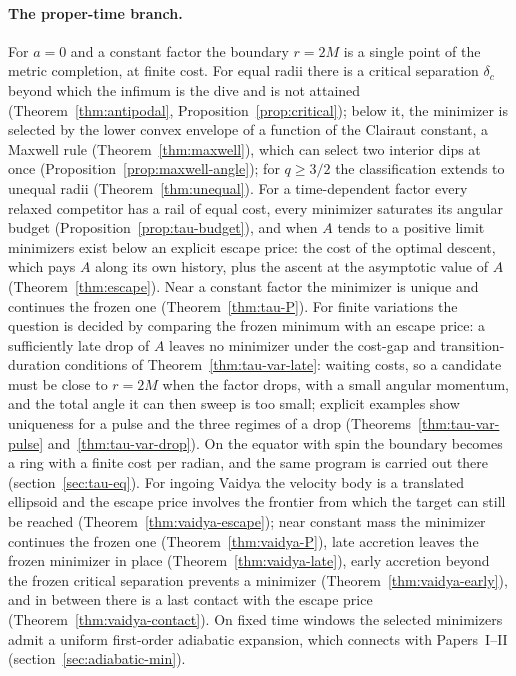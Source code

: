 \documentclass[aip,jmp,amsmath,amssymb,reprint]{revtex4-2}
\theoremstyle{plain}
\theoremstyle{definition}
\begin{document}
\paragraph{The proper-time branch.} For $a=0$ and a constant factor the boundary $r=2M$ is a single
point of the metric completion, at finite cost. For equal radii there is a critical separation
$\delta_c$ beyond which the infimum is the dive and is not attained (Theorem~\ref{thm:antipodal},
Proposition~\ref{prop:critical}); below it, the minimizer is selected by the lower convex envelope of
a function of the Clairaut constant, a Maxwell rule (Theorem~\ref{thm:maxwell}), which can select two
interior dips at once (Proposition~\ref{prop:maxwell-angle}); for $q\ge3/2$ the classification extends
to unequal radii (Theorem~\ref{thm:unequal}). For a time-dependent factor every relaxed competitor
has a rail of equal cost, every minimizer saturates its angular budget
(Proposition~\ref{prop:tau-budget}), and when $A$ tends to a positive limit minimizers exist below an
explicit escape price: the cost of
the optimal descent, which pays $A$ along its own history, plus the ascent at the asymptotic value of
$A$ (Theorem~\ref{thm:escape}). Near a constant factor the minimizer is unique and continues the frozen
one (Theorem~\ref{thm:tau-P}). For finite variations the question is decided by comparing the frozen
minimum with an escape price: a sufficiently late drop of $A$ leaves no minimizer under the
cost-gap and transition-duration conditions of Theorem~\ref{thm:tau-var-late}: waiting costs, so a candidate must be close to $r=2M$ when
the factor drops, with a small angular momentum, and the total angle it can then sweep is too small; explicit examples show uniqueness for a pulse and the three
regimes of a drop (Theorems~\ref{thm:tau-var-pulse} and~\ref{thm:tau-var-drop}). On the equator with
spin the boundary becomes a ring with a finite cost per radian, and the same program is carried out
there (section~\ref{sec:tau-eq}). For ingoing Vaidya the velocity body is a translated ellipsoid and
the escape price involves the frontier from which the target can still be reached
(Theorem~\ref{thm:vaidya-escape}); near constant mass the minimizer continues the frozen one
(Theorem~\ref{thm:vaidya-P}), late accretion leaves the frozen minimizer in place
(Theorem~\ref{thm:vaidya-late}), early accretion beyond the frozen critical separation prevents a
minimizer (Theorem~\ref{thm:vaidya-early}), and in between there is a last contact with the escape
price (Theorem~\ref{thm:vaidya-contact}). On fixed time windows the selected minimizers admit a uniform
first-order adiabatic expansion, which connects with Papers~I--II (section~\ref{sec:adiabatic-min}).
\end{document}
